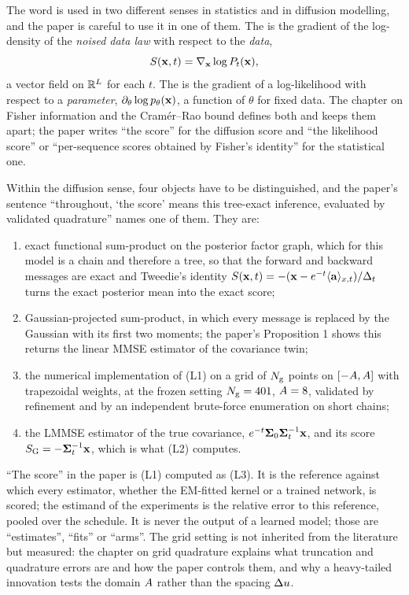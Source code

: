 The word  is used in two different senses in statistics and in diffusion
modelling, and the paper is careful to use it in one of them. The
 is the gradient of the log-density of the \emph{noised data law}
with respect to the \emph{data},
\begin{equation}
  S(\mathbf{x},t)=\nabla_{\mathbf{x}}\log P_t(\mathbf{x}),
\end{equation}
a vector field on $\mathbb{R}^{L}$ for each $t$. The  is the
gradient of a log-likelihood with respect to a \emph{parameter},
$\partial_\theta\log p_\theta(\mathbf{x})$, a function of $\theta$ for fixed data. The chapter on
Fisher information and the Cram\'er--Rao bound defines both and keeps them apart; the
paper writes ``the score'' for the diffusion score and ``the likelihood score'' or
``per-sequence scores obtained by Fisher's identity'' for the statistical one.

Within the diffusion sense, four objects have to be distinguished, and the paper's
sentence ``throughout, `the score' means this tree-exact inference, evaluated by
validated quadrature'' names one of them. They are:
\begin{enumerate}[label=(L\arabic*)]
\item exact functional sum-product on the posterior factor graph, which for this model
  is a chain and therefore a tree, so that the forward and backward messages are
  exact and Tweedie's identity $S(\mathbf{x},t)=-(\mathbf{x}-e^{-t}\langle \mathbf{a} \rangle_{x,t})/\Delta_t$ turns the
  exact posterior mean into the exact score;
\item Gaussian-projected sum-product, in which every message is replaced by the Gaussian
  with its first two moments; the paper's Proposition 1 shows this returns the linear
  MMSE estimator of the covariance twin;
\item the numerical implementation of (L1) on a grid of $N_{\mathrm{g}}$ points on
  $[-A,A]$ with trapezoidal weights, at the frozen setting
  $N_{\mathrm{g}}=401$, $A=8$, validated by refinement and by an independent brute-force
  enumeration on short chains;
\item the LMMSE estimator of the true covariance, $e^{-t}\mathbf{\Sigma}_0\mathbf{\Sigma}_t^{-1}\mathbf{x}$, and its
  score $S_{\mathrm{G}}=-\mathbf{\Sigma}_t^{-1}\mathbf{x}$, which is what (L2) computes.
\end{enumerate}
``The score'' in the paper is (L1) computed as (L3). It is the reference against which
every estimator, whether the EM-fitted kernel or a trained network, is scored; the
estimand of the experiments is the relative error to this reference, pooled over the
schedule. It is never the output of a learned model; those are ``estimates'',
``fits'' or ``arms''. The grid setting is not inherited from the literature but
measured: the chapter on grid quadrature explains what truncation and quadrature
errors are and how the paper controls them, and why a heavy-tailed innovation tests the
domain $A$ rather than the spacing $\Delta u$.

